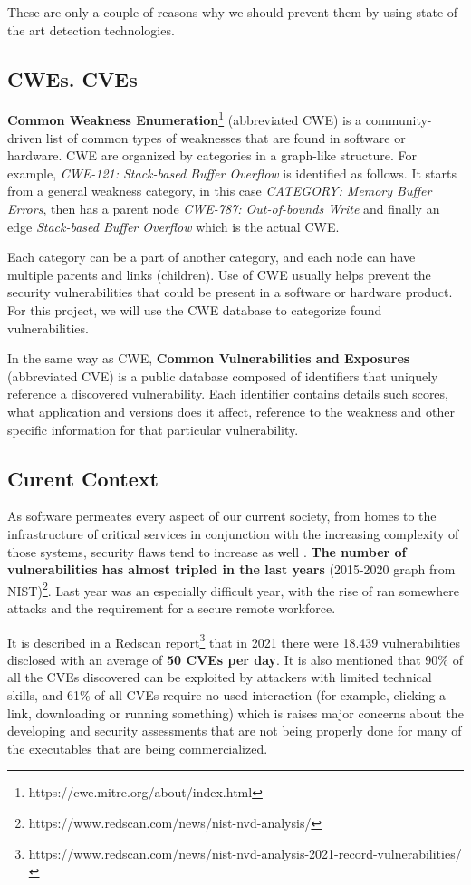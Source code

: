 \documentclass[12pt,a4paper,english,onecolumn]{IEEEtran}
\begin{document}
These are only a couple of reasons why we should prevent them by using state of the art detection technologies.

\subsection{CWEs. CVEs}

\textbf{Common Weakness Enumeration}\footnote{https://cwe.mitre.org/about/index.html} (abbreviated CWE) is a community-driven list of common types of weaknesses that are found in software or hardware. CWE are organized by categories in a graph-like structure. For example, \textit{CWE-121: Stack-based Buffer Overflow} is identified as follows. It starts from a general weakness category, in this case \textit{CATEGORY: Memory Buffer Errors}, then has a parent node \textit{CWE-787: Out-of-bounds Write} and finally an edge \textit{Stack-based Buffer Overflow} which is the actual CWE.

Each category can be a part of another category, and each node can have multiple parents and links (children). Use of CWE usually helps prevent the security vulnerabilities that could be present in a software or hardware product. For this project, we will use the CWE database to categorize found vulnerabilities.

In the same way as CWE, \textbf{Common Vulnerabilities and Exposures} (abbreviated CVE) is a public database composed of identifiers that uniquely reference a discovered vulnerability. Each identifier contains details such scores, what application and versions does it affect, reference to the weakness and other specific information for that particular vulnerability. 

\subsection{Curent Context}

As software permeates every aspect of our current society, from homes to the infrastructure of critical services in conjunction with the increasing complexity of those systems, security flaws tend to increase as well \cite{hacrs}. \textbf{The number of vulnerabilities has almost tripled in the last years} (2015-2020 graph from NIST)\footnote{https://www.redscan.com/news/nist-nvd-analysis/}. Last year was an especially difficult year, with the rise of ran somewhere attacks and the requirement for a secure remote workforce.

It is described in a Redscan report\footnote{https://www.redscan.com/news/nist-nvd-analysis-2021-record-vulnerabilities/} that in 2021 there were 18.439 vulnerabilities disclosed with an average of \textbf{50 CVEs per day}. It is also mentioned that 90\% of all the CVEs discovered can be exploited by attackers with limited technical skills, and 61\% of all CVEs require no used interaction (for example, clicking a link, downloading or running something) which is raises major concerns about the developing and security assessments that are not being properly done for many of the executables that are being commercialized.
\end{document}
